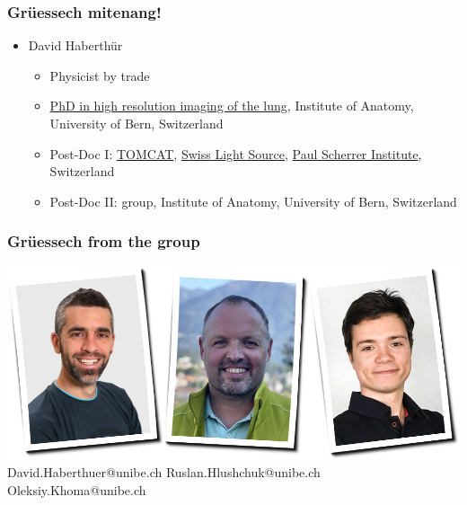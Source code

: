 \begin{frame}
	\frametitle{Grüessech mitenang!}
	\begin{itemize}
		\item David Haberthür
		\begin{itemize}
			\item Physicist by trade
			\item \href{https://boris.unibe.ch/2619/}{PhD in high resolution imaging of the lung}, Institute of Anatomy, University of Bern, Switzerland
			\item Post-Doc I: \href{https://www.psi.ch/sls/tomcat/}{TOMCAT}, \href{https://www.psi.ch/sls/}{Swiss Light Source}, \href{https://www.psi.ch/}{Paul Scherrer Institute}, Switzerland
			\item Post-Doc II: \uct group, Institute of Anatomy, University of Bern, Switzerland
		\end{itemize}
	\end{itemize}
\end{frame}

\begin{frame}
	\frametitle{Grüessech from the \uct group}
		\centering%
		\includegraphics[width=\imagewidth]{./images/team}
		\hfill%
		David{\color{ubRed}.}Haberthuer{\color{ubRed}@unibe.ch}%
		\hfill%
		Ruslan{\color{ubRed}.}Hlushchuk{\color{ubRed}@unibe.ch}%
		\hfill%
		Oleksiy{\color{ubRed}.}Khoma{\color{ubRed}@unibe.ch}%
		\hfill%
\end{frame}

